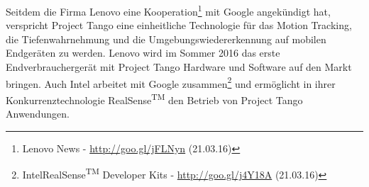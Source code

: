 Seitdem die Firma Lenovo eine Kooperation\footnote{Lenovo News - \url{http://goo.gl/jFLNyn} (21.03.16)} mit Google angekündigt hat, verspricht Project Tango eine einheitliche Technologie für das Motion Tracking, die Tiefenwahrnehmung und die Umgebungswiedererkennung auf mobilen Endgeräten zu werden. Lenovo wird im Sommer 2016 das erste Endverbraucher\-gerät mit Project Tango Hardware und Software auf den Markt bringen. Auch Intel arbeitet mit Google zusammen\footnote{Intel\textregistered RealSense\textsuperscript{TM} Developer Kits - \url{http://goo.gl/j4Y18A} (21.03.16)} und ermöglicht in ihrer Konkurrenztechnologie RealSense\textsuperscript{TM} den Betrieb von Project Tango Anwendungen. 
	